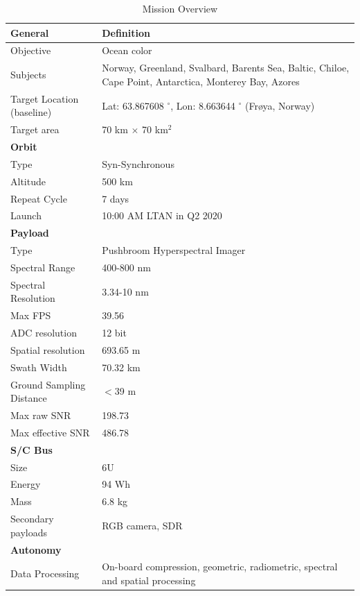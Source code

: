 \begin{table}[htbp]
	\centering
			\caption{\hypso Mission Overview}
		\begin{tabular}{|l|p{12cm}|}
			\hline
			\textbf{General}	&			\textbf{Definition} 			\\ 
			\hline
		  Objective       &   Ocean color \\
			Subjects & Norway, Greenland, Svalbard, Barents Sea, Baltic, Chiloe, Cape Point, Antarctica, Monterey Bay, Azores \\
			Target Location (baseline) & Lat: 63.867608 $^{\circ}$, Lon: 8.663644 $^{\circ}$ (Fr{\o}ya, Norway) \\
			Target area & 70 km $\times$ 70 km$^2$\\
			\hline
			\textbf{Orbit}	&						\\ 
			\hline
			Type      & Syn-Synchronous \\
      Altitude        &        500 km \\
			Repeat Cycle & 7 days \\
			Launch & 10:00 AM LTAN in Q2 2020 \\
		  \hline
			\textbf{Payload}	&			 			\\ 
			\hline
			Type       &  Pushbroom Hyperspectral Imager \\
			Spectral Range & 400-800 nm \\
			Spectral Resolution & 3.34-10 nm \\
			Max FPS & 39.56 \\
			ADC resolution & 12 bit \\
			Spatial resolution &  693.65 m \\
			Swath Width & 70.32 km \\
      Ground Sampling Distance & $<$39 m \\
			Max raw SNR & 198.73 \\
			Max effective SNR & 486.78 \\
			\hline
			\textbf{S/C Bus} & \\
			\hline
			Size        &         6U \\
	    Energy     &         94 Wh \\
			Mass     &         	6.8 kg \\
			Secondary payloads & RGB camera, SDR \\
			\hline
			\textbf{Autonomy}	&			 			\\ 
			\hline
			Data Processing & On-board compression, geometric, radiometric, spectral and spatial processing \\

\end{tabular}
\end{table}
